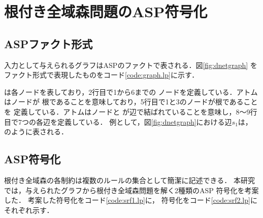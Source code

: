 \section{根付き全域森問題のASP符号化}

\subsection{ASPファクト形式}\label{sec:encode:graph}
入力として与えられるグラフはASPのファクトで表される．図\ref{fig:dnetgraph}
をファクト形式で表現したものをコード\ref{code:graph.lp}に示す．



は各ノードを表しており，2行目で1から6までの
ノードを定義している．アトムはノードが
根であることを意味しており，5行目で1と3のノードが根であることを
定義している．アトムはノードと
が辺で結ばれていることを意味し，8～9行目で7つの各辺を定義している．
例として，図\ref{fig:dnetgraph}における辺$s_{1}$は，
のように表される．

\subsection{ASP符号化}\label{sec:encode:prog}
根付き全域森の各制約は複数のルールの集合として簡潔に記述できる．
本研究では，与えられたグラフから根付き全域森問題を解く2種類のASP
符号化を考案した．
考案した符号化をコード\ref{code:srf1.lp}に，
符号化をコード\ref{code:srf2.lp}にそれぞれ示す．





